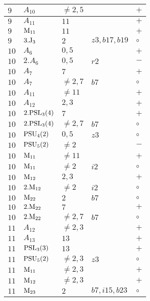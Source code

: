 \documentclass[a4paper, 11pt]{article}
\begin{document}
\begin{longtable}{lllll}
		$9$ & $A_{10}$ & $\neq 2,5$ & & $+$ \\ \hline
		$9$ & $A_{11}$ & $11$ & & $+$ \\ \hline
		$9$ & ${\rm M}_{11}$ & $11$ & & $+$ \\ \hline
		$9$ & $3.{\rm J}_3$ & $2$ & $z3, b17, b19$ & $\circ$ \\ \hline
		$10$ & $A_{6}$ & $0,5$ & & $+$ \\ \hline
		$10$ & $2.A_{6}$ & $0,5$ & $r2$ & $-$ \\ \hline
		$10$ & $A_{7}$ & $7$ & & $+$ \\ \hline
		$10$ & $A_{7}$ & $\neq 2,7$ & $b7$ & $\circ$ \\ \hline
		$10$ & $A_{11}$ & $\neq 11$ & & $+$ \\ \hline
		$10$ & $A_{12}$ & $2,3$ & & $+$ \\ \hline
		$10$ & $2.{\rm PSL}_{3}(4)$ & $7$ & & $+$ \\ \hline
		$10$ & $2.{\rm PSL}_{3}(4)$ & $\neq 2,7$ & $b7$ & $\circ$ \\ \hline
		$10$ & ${\rm PSU}_{4}(2)$ & $0,5$ & $z3$ & $\circ$ \\ \hline
		$10$ & ${\rm PSU}_{5}(2)$ & $\neq 2$ & & $-$ \\ \hline
		$10$ & ${\rm M}_{11}$ & $\neq 11$ & & $+$ \\ \hline
		$10$ & ${\rm M}_{11}$ & $\neq 2$ & $i2$ & $\circ$ \\ \hline
		$10$ & ${\rm M}_{12}$ & $2, 3$ & & $+$ \\ \hline
		$10$ & $2.{\rm M}_{12}$ & $\neq 2$ & $i2$ & $\circ$ \\ \hline
		$10$ & ${\rm M}_{22}$ & $2$ & $b7$ & $\circ$ \\ \hline
		$10$ & $2.{\rm M}_{22}$ & $7$ & & $+$ \\ \hline
		$10$ & $2.{\rm M}_{22}$ & $\neq 2,7$ & $b7$ & $\circ$ \\ \hline
		$11$ & $A_{12}$ & $\neq 2,3$ & & $+$ \\ \hline
		$11$ & $A_{13}$ & $13$ & & $+$ \\ \hline
		$11$ & ${\rm PSL}_{3}(3)$ & $13$ & & $+$ \\ \hline
		$11$ & ${\rm PSU}_{5}(2)$ & $\neq 2,3$ & $z3$ & $\circ$ \\ \hline
		$11$ & ${\rm M}_{11}$ & $\neq 2,3$ & & $+$ \\ \hline
		$11$ & ${\rm M}_{12}$ & $\neq 2,3$ & & $+$ \\ \hline
		$11$ & ${\rm M}_{23}$ & $2$ & $b7, i15, b23$ & $\circ$ \\ \hline

\end{longtable}
\end{document}

